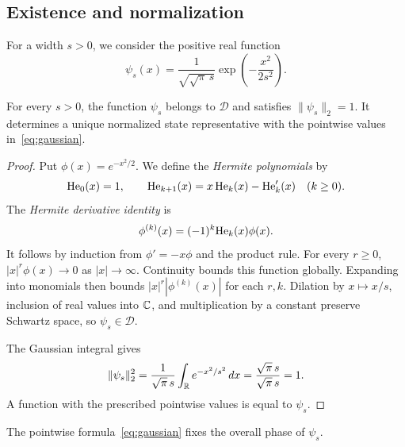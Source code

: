 \subsection{Existence and normalization}
For a width $s>0$, we consider the positive real function
\begin{equation}\label{eq:gaussian}
 \psi_s(x)=\frac{1}{\sqrt{\sqrt\pi\,s}}
            \exp\left(-\frac{x^2}{2s^2}\right).
\end{equation}
\begin{theorem}\label{thm:normalized}
For every $s>0$, the function $\psi_s$ belongs to $\mathcal D$ and satisfies
$\|\psi_s\|_2=1$. It determines a unique normalized state representative
with the pointwise values in~\eqref{eq:gaussian}.
\end{theorem}
\begin{proof}
Put $\phi(x)=e^{-x^2/2}$. We define the \emph{Hermite polynomials} by
\[
 \mathrm{He}_0(x)=1,\qquad \mathrm{He}_{k+1}(x)=x\,\mathrm{He}_k(x)-\mathrm{He}_k'(x)\quad(k\geq0).
\]
The \emph{Hermite derivative identity} is
\[
 \phi^{(k)}(x)=(-1)^k \mathrm{He}_k(x)\phi(x).
\]
It follows by induction from $\phi'=-x\phi$ and the product rule.
For every $r\geq0$, $|x|^r\phi(x)\to0$ as $|x|\to\infty$.
Continuity bounds this function globally. Expanding  into monomials
then bounds $|x|^r|\phi^{(k)}(x)|$ for each $r,k$.
Dilation by $x\mapsto x/s$, inclusion of real values into $\mathbb C$, and
multiplication by a constant preserve Schwartz space, so $\psi_s\in\mathcal D$.

The Gaussian integral gives
\[
 \|\psi_s\|_2^2
 =\frac{1}{\sqrt\pi\,s}\int_\mathbb R e^{-x^2/s^2}\,dx
 =\frac{\sqrt\pi\,s}{\sqrt\pi\,s}=1.
\]
A function with the prescribed pointwise values is equal to $\psi_s$.
\end{proof}
The pointwise formula~\eqref{eq:gaussian} fixes the overall phase of $\psi_s$.

